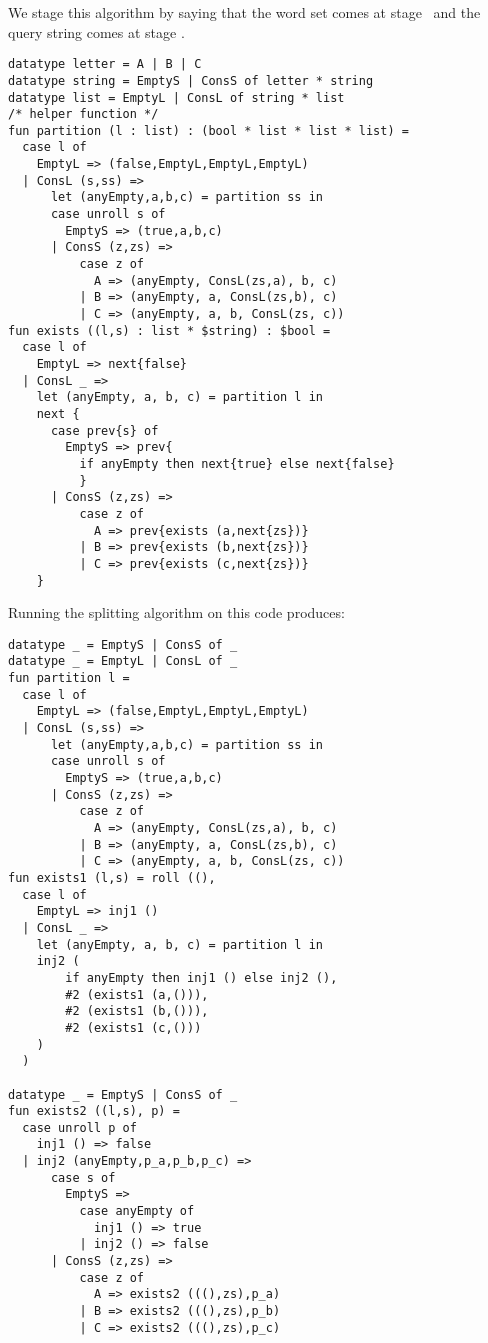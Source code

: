 We stage this algorithm by saying that the word set comes at stage \bbone\
and the query string comes at stage \bbtwo.

\begin{lstlisting} 
datatype letter = A | B | C
datatype string = EmptyS | ConsS of letter * string
datatype list = EmptyL | ConsL of string * list
/* helper function */
fun partition (l : list) : (bool * list * list * list) =
  case l of
    EmptyL => (false,EmptyL,EmptyL,EmptyL)
  | ConsL (s,ss) =>
      let (anyEmpty,a,b,c) = partition ss in
      case unroll s of
        EmptyS => (true,a,b,c)
      | ConsS (z,zs) =>
          case z of 
            A => (anyEmpty, ConsL(zs,a), b, c) 
          | B => (anyEmpty, a, ConsL(zs,b), c) 
          | C => (anyEmpty, a, b, ConsL(zs, c))
fun exists ((l,s) : list * $string) : $bool =
  case l of 
    EmptyL => next{false} 
  | ConsL _ => 
    let (anyEmpty, a, b, c) = partition l in
    next {
      case prev{s} of
        EmptyS => prev{
          if anyEmpty then next{true} else next{false}
          }
      | ConsS (z,zs) =>
          case z of
            A => prev{exists (a,next{zs})}
          | B => prev{exists (b,next{zs})} 
          | C => prev{exists (c,next{zs})}
    }
\end{lstlisting}

\noindent
Running the splitting algorithm on this code produces:

\begin{lstlisting} 
datatype _ = EmptyS | ConsS of _
datatype _ = EmptyL | ConsL of _
fun partition l =
  case l of
    EmptyL => (false,EmptyL,EmptyL,EmptyL)
  | ConsL (s,ss) =>
      let (anyEmpty,a,b,c) = partition ss in
      case unroll s of
        EmptyS => (true,a,b,c)
      | ConsS (z,zs) =>
          case z of 
            A => (anyEmpty, ConsL(zs,a), b, c) 
          | B => (anyEmpty, a, ConsL(zs,b), c) 
          | C => (anyEmpty, a, b, ConsL(zs, c))
fun exists1 (l,s) = roll ((), 
  case l of 
    EmptyL => inj1 ()
  | ConsL _ => 
    let (anyEmpty, a, b, c) = partition l in
    inj2 (
    	if anyEmpty then inj1 () else inj2 (), 
    	#2 (exists1 (a,())), 
    	#2 (exists1 (b,())), 
    	#2 (exists1 (c,()))
    )
  )

datatype _ = EmptyS | ConsS of _
fun exists2 ((l,s), p) =
  case unroll p of 
    inj1 () => false
  | inj2 (anyEmpty,p_a,p_b,p_c) => 
      case s of
        EmptyS => 
          case anyEmpty of 
            inj1 () => true 
          | inj2 () => false
      | ConsS (z,zs) =>
          case z of
            A => exists2 (((),zs),p_a)
          | B => exists2 (((),zs),p_b)
          | C => exists2 (((),zs),p_c)
\end{lstlisting}

